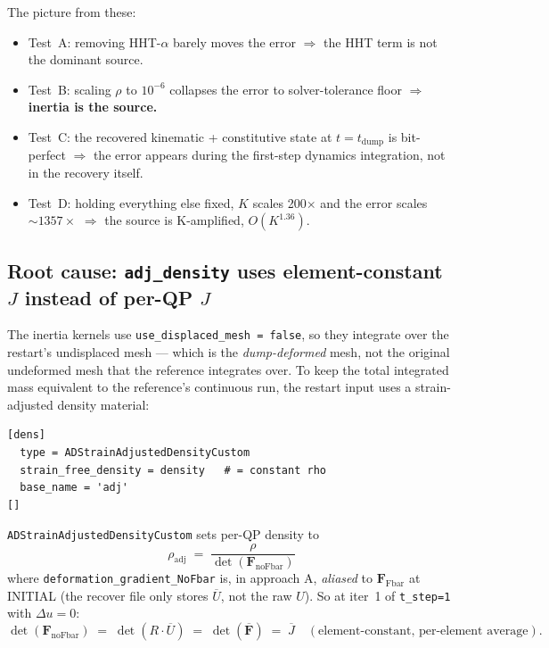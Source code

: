 \documentclass[11pt]{article}
\newcommand{\F}{\mathbf{F}}
\newcommand{\Fbar}{\overline{\F}}
\begin{document}
The picture from these:
\begin{itemize}
\item Test~A: removing HHT-$\alpha$ barely moves the error $\Rightarrow$ the HHT term is not the dominant source.
\item Test~B: scaling $\rho$ to $10^{-6}$ collapses the error to solver-tolerance floor $\Rightarrow$ \textbf{inertia is the source.}
\item Test~C: the recovered kinematic + constitutive state at $t = t_{\text{dump}}$ is bit-perfect $\Rightarrow$ the error appears during the first-step dynamics integration, not in the recovery itself.
\item Test~D: holding everything else fixed, $K$ scales 200$\times$ and the error scales $\sim 1357\times$ $\Rightarrow$ the source is K-amplified, $O(K^{1.36})$.
\end{itemize}

\subsection{Root cause: \texttt{adj\_density} uses element-constant $J$ instead of per-QP $J$}

The inertia kernels use \texttt{use\_displaced\_mesh = false}, so they integrate over the restart's undisplaced mesh --- which is the \emph{dump-deformed} mesh, not the original undeformed mesh that the reference integrates over. To keep the total integrated mass equivalent to the reference's continuous run, the restart input uses a strain-adjusted density material:

\begin{lstlisting}
[dens]
  type = ADStrainAdjustedDensityCustom
  strain_free_density = density   # = constant rho
  base_name = 'adj'
[]
\end{lstlisting}

\texttt{ADStrainAdjustedDensityCustom} sets per-QP density to
\begin{equation}
\rho_{\text{adj}} \;=\; \frac{\rho}{\det(\F_{\text{noFbar}})}
\label{eq:adjdens}
\end{equation}
where \texttt{deformation\_gradient\_NoFbar} is, in approach A, \emph{aliased} to $\F_{\text{Fbar}}$ at INITIAL (the recover file only stores $\overline{U}$, not the raw $U$). So at iter~1 of \texttt{t\_step=1} with $\Delta u = 0$:
\begin{equation*}
\det(\F_{\text{noFbar}}) \;=\; \det(R \cdot \overline{U}) \;=\; \det(\Fbar) \;=\; \overline{J} \quad (\text{element-constant, per-element average}).
\end{equation*}
\end{document}
